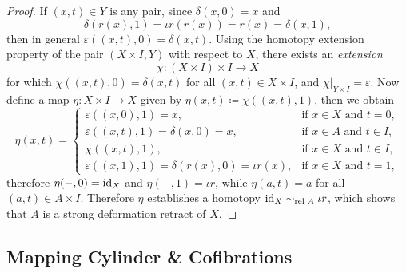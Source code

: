 \begin{proof}
    If \((x, t) \in Y\) is any pair, since \(\delta(x, 0) = x\) and
    \[
        \delta(r(x), 1) = \iota r(r(x)) = r(x) = \delta(x, 1),
    \]
    then in general \(\varepsilon((x, t), 0) = \delta(x, t)\). Using the homotopy
    extension property of the pair \((X \times I, Y)\) with respect to \(X\), there
    exists an \emph{extension}
    \[
        \chi: (X \times I) \times I \to X
    \]
    for which \(\chi((x, t), 0) = \delta(x, t)\) for all \((x, t) \in X \times I\),
    and \(\chi|_{Y \times I} = \varepsilon\). Now define a map \(\eta: X \times I
    \to X\) given by \(\eta(x, t) \coloneq \chi((x, t), 1)\), then we obtain
    \[
        \eta(x, t) =
        \begin{cases}
            \varepsilon((x, 0), 1) = x,
                             & \text{if } x \in X \text{ and } t = 0,
            \\
            \varepsilon((x, t), 1) = \delta(x, 0) = x,
                             & \text{if } x \in A \text{ and } t \in I,
            \\
            \chi((x, t), 1), & \text{if } x \in X \text{ and } t \in I,
            \\
            \varepsilon((x, 1), 1)
            = \delta(r(x), 0) = \iota r(x),
                             & \text{if } x \in X \text{ and } t = 1,
        \end{cases}
    \]
    therefore \(\eta(-, 0) = \operatorname{id}_X\) and \(\eta(-, 1) = \iota r\), while \(\eta(a,
    t) = a\) for all \((a, t) \in A \times I\). Therefore \(\eta\) establishes a
    homotopy \(\operatorname{id}_X \sim_{\text{rel }{A}} \iota r\), which shows that \(A\) is a strong
    deformation retract of \(X\).
\end{proof}

\subsection{Mapping Cylinder \& Cofibrations}

